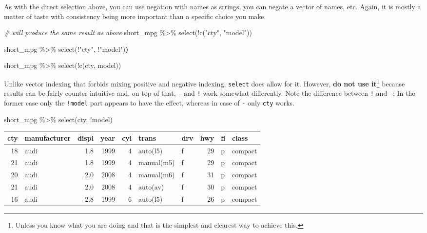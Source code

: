 \documentclass[
]{book}
\newenvironment{Shaded}{\begin{snugshade}}{\end{snugshade}}
\newcommand{\CommentTok}[1]{\textcolor[rgb]{0.56,0.35,0.01}{\textit{#1}}}
\newcommand{\ErrorTok}[1]{\textcolor[rgb]{0.64,0.00,0.00}{\textbf{#1}}}
\newcommand{\FunctionTok}[1]{\textcolor[rgb]{0.00,0.00,0.00}{#1}}
\newcommand{\NormalTok}[1]{#1}
\newcommand{\SpecialCharTok}[1]{\textcolor[rgb]{0.00,0.00,0.00}{#1}}
\newcommand{\StringTok}[1]{\textcolor[rgb]{0.31,0.60,0.02}{#1}}
\begin{document}
As with the direct selection above, you can use negation with names as strings, you can negate a vector of names, etc. Again, it is mostly a matter of taste with consistency being more important than a specific choice you make.

\begin{Shaded}
\begin{Highlighting}[]
\CommentTok{\# will produce the same result as above}
\NormalTok{short\_mpg }\SpecialCharTok{\%\textgreater{}\%}
  \FunctionTok{select}\NormalTok{(}\SpecialCharTok{!}\FunctionTok{c}\NormalTok{(}\StringTok{"cty"}\NormalTok{, }\StringTok{"model"}\NormalTok{))}

\NormalTok{short\_mpg }\SpecialCharTok{\%\textgreater{}\%}
  \FunctionTok{select}\NormalTok{(}\SpecialCharTok{!}\StringTok{"cty"}\NormalTok{, }\SpecialCharTok{!}\StringTok{"model"}\NormalTok{)}\ErrorTok{)}
  
\NormalTok{short\_mpg }\SpecialCharTok{\%\textgreater{}\%}
  \FunctionTok{select}\NormalTok{(}\SpecialCharTok{!}\FunctionTok{c}\NormalTok{(cty, model))}
\end{Highlighting}
\end{Shaded}

Unlike vector indexing that forbids mixing positive and negative indexing, \texttt{select} does allow for it. However, \textbf{do not use it}\footnote{Unless you know what you are doing and that is the simplest and clearest way to achieve this.} because results can be fairly counter-intuitive and, on top of that, \texttt{-} and \texttt{!} work somewhat differently. Note the difference between \texttt{!} and \texttt{-}: In the former case only the \texttt{!model} part appears to have the effect, whereas in case of \texttt{-} only \texttt{cty} works.

\begin{Shaded}
\begin{Highlighting}[]
\NormalTok{short\_mpg }\SpecialCharTok{\%\textgreater{}\%}
  \FunctionTok{select}\NormalTok{(cty, }\SpecialCharTok{!}\NormalTok{model)}
\end{Highlighting}
\end{Shaded}

\begin{tabular}{r|l|r|r|r|l|l|r|l|l}
\hline
cty & manufacturer & displ & year & cyl & trans & drv & hwy & fl & class\\
\hline
18 & audi & 1.8 & 1999 & 4 & auto(l5) & f & 29 & p & compact\\
\hline
21 & audi & 1.8 & 1999 & 4 & manual(m5) & f & 29 & p & compact\\
\hline
20 & audi & 2.0 & 2008 & 4 & manual(m6) & f & 31 & p & compact\\
\hline
21 & audi & 2.0 & 2008 & 4 & auto(av) & f & 30 & p & compact\\
\hline
16 & audi & 2.8 & 1999 & 6 & auto(l5) & f & 26 & p & compact\\
\hline
\end{tabular}
\end{document}
